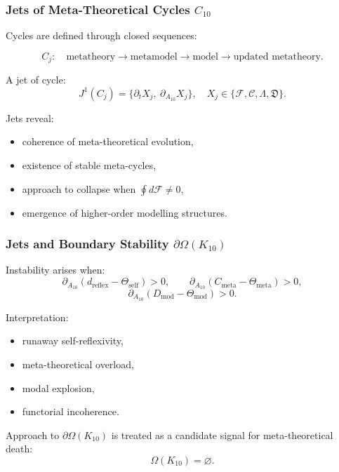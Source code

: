 \subsubsection{Jets of Meta-Theoretical Cycles $C_{10}$}

Cycles are defined through closed sequences:

\[
C_j:
\quad
\text{metatheory}
\to \text{metamodel}
\to \text{model}
\to \text{updated metatheory}.
\]

A jet of cycle:
\[
J^1(C_j)
=
\{\partial_t X_j,\ \partial_{A_{10}}X_j\},
\quad
X_j\in\{\mathcal{F},\mathcal{C},\Lambda,\mathfrak{D}\}.
\]

Jets reveal:
\begin{itemize}
    \item coherence of meta-theoretical evolution,
    \item existence of stable meta-cycles,
    \item approach to collapse when $\oint d\mathcal{F}\neq0$,
    \item emergence of higher-order modelling structures.
\end{itemize}


\subsubsection{Jets and Boundary Stability $\partial\Omega(K_{10})$}

Instability arises when:
\[
\partial_{A_{10}}
(d_{\mathrm{reflex}}-\Theta_{\mathrm{self}}) > 0,
\qquad
\partial_{A_{10}}
(C_{\mathrm{meta}}-\Theta_{\mathrm{meta}}) > 0,
\]
\[
\partial_{A_{10}}
(D_{\mathrm{mod}}-\Theta_{\mathrm{mod}}) > 0.
\]

Interpretation:
\begin{itemize}
    \item runaway self-reflexivity,
    \item meta-theoretical overload,
    \item modal explosion,
    \item functorial incoherence.
\end{itemize}

Approach to $\partial\Omega(K_{10})$ is treated as a candidate signal for meta-theoretical death:
\[
\Omega(K_{10})=\varnothing.
\]


